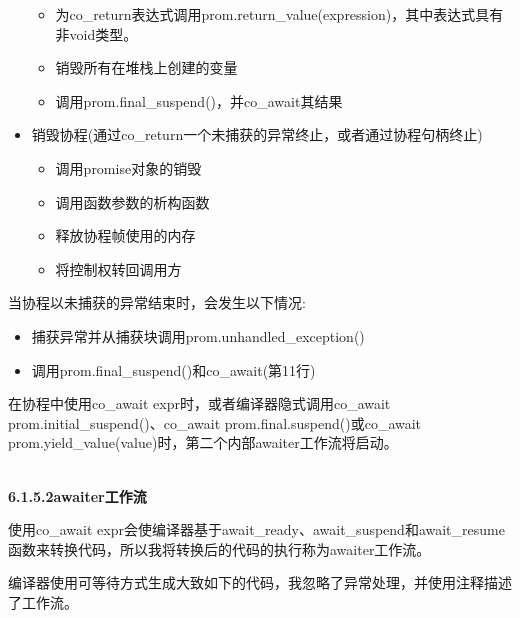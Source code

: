 \begin{itemize}
\begin{itemize}
\item 
为co\_return表达式调用prom.return\_value(expression)，其中表达式具有非void类型。

\item 
销毁所有在堆栈上创建的变量

\item 
调用prom.final\_suspend()，并co\_await其结果
\end{itemize}

\item 
销毁协程(通过co\_return一个未捕获的异常终止，或者通过协程句柄终止)
\begin{itemize}
\item 
调用promise对象的销毁

\item 
调用函数参数的析构函数

\item 
释放协程帧使用的内存

\item 
将控制权转回调用方
\end{itemize}
\end{itemize}

当协程以未捕获的异常结束时，会发生以下情况:

\begin{itemize}
\item 
捕获异常并从捕获块调用prom.unhandled\_exception()

\item 
调用prom.final\_suspend()和co\_await(第11行)
\end{itemize}

在协程中使用co\_await expr时，或者编译器隐式调用co\_await prom.initial\_suspend()、co\_await prom.final.suspend()或co\_await prom.yield\_value(value)时，第二个内部awaiter工作流将启动。

\hspace*{\fill} \\ %
\noindent
\textbf{6.1.5.2\hspace{0.2cm}awaiter工作流}

使用co\_await expr会使编译器基于await\_ready、await\_suspend和await\_resume函数来转换代码，所以我将转换后的代码的执行称为awaiter工作流。

编译器使用可等待方式生成大致如下的代码，我忽略了异常处理，并使用注释描述了工作流。

